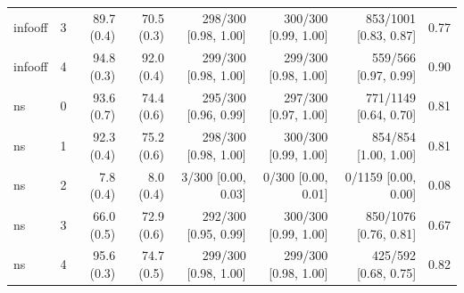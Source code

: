 \begin{tabular}{llrrrrrr}
infooff & 3 & 89.7 (0.4) & 70.5 (0.3) & 298/300 [0.98, 1.00] & 300/300 [0.99, 1.00] & 853/1001 [0.83, 0.87] & 0.77 \\
infooff & 4 & 94.8 (0.3) & 92.0 (0.4) & 299/300 [0.98, 1.00] & 299/300 [0.98, 1.00] & 559/566 [0.97, 0.99] & 0.90 \\
ns & 0 & 93.6 (0.7) & 74.4 (0.6) & 295/300 [0.96, 0.99] & 297/300 [0.97, 1.00] & 771/1149 [0.64, 0.70] & 0.81 \\
ns & 1 & 92.3 (0.4) & 75.2 (0.6) & 298/300 [0.98, 1.00] & 300/300 [0.99, 1.00] & 854/854 [1.00, 1.00] & 0.81 \\
ns & 2 & 7.8 (0.4) & 8.0 (0.4) & 3/300 [0.00, 0.03] & 0/300 [0.00, 0.01] & 0/1159 [0.00, 0.00] & 0.08 \\
ns & 3 & 66.0 (0.5) & 72.9 (0.6) & 292/300 [0.95, 0.99] & 300/300 [0.99, 1.00] & 850/1076 [0.76, 0.81] & 0.67 \\
ns & 4 & 95.6 (0.3) & 74.7 (0.5) & 299/300 [0.98, 1.00] & 299/300 [0.98, 1.00] & 425/592 [0.68, 0.75] & 0.82 \\
\bottomrule
\end{tabular}
